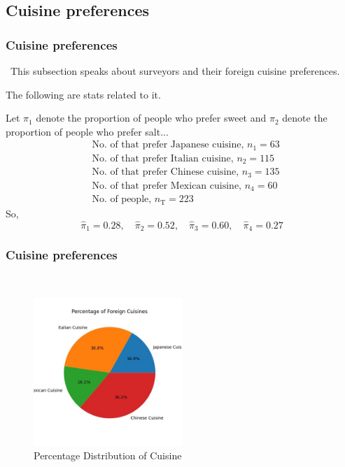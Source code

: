 \documentclass{beamer}
\begin{document}
\subsection{Cuisine preferences }
\begin{frame}
    \frametitle{Cuisine preferences}\
    This subsection speaks about surveyors and their foreign cuisine preferences.
    
    The following are stats related to it.
    
    Let $\pi_1$ denote the proportion of people who prefer sweet and $\pi_2$ denote the proportion of people who prefer salt...
    \begin{align}
        &\text{No. of that prefer Japanese cuisine, } n_{\text{1}} = 63 \\
        &\text{No. of that prefer Italian cuisine, } n_{\text{2}} = 115 \\
        &\text{No. of that prefer Chinese cuisine, } n_{\text{3}} = 135\\
        &\text{No. of that prefer Mexican cuisine, } n_{\text{4}} = 60\\
        &\text{No. of people, } n_{\text{T}} = 223
    \end{align}
    So,
    \begin{equation}
        \hat{\pi}_1  = 0.28, \quad \hat{\pi}_2  = 0.52, \quad \hat{\pi}_3  = 0.60, \quad \hat{\pi}_4  = 0.27
    \end{equation}
\end{frame}

\begin{frame}
    \frametitle{Cuisine preferences }\
    \begin{figure}
    \centering
    \includegraphics[width=0.5\textwidth]{Percentage of Foreign cuisines.jpg} %
    \caption{Percentage Distribution of Cuisine} %
    \label{fig:Percentage Distribution of Cuisine} %
    \end{figure}
\end{frame}
\end{document}

